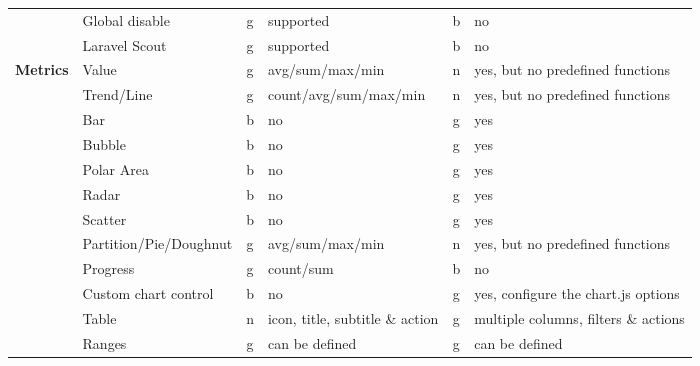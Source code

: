 \begin{table}[]
{\begin{tabular}{llclcl}
            & Global disable         & g           & supported                       & b           & no                                       \\
            & Laravel Scout          & g           & supported                       & b           & no                                       \\
            \hline
            \multirow{15}{*}{\textbf{Metrics}}       & Value                  & g           & avg/sum/max/min                 & n           & yes, but no predefined functions         \\
            & Trend/Line             & g           & count/avg/sum/max/min           & n           & yes, but no predefined functions         \\
            & Bar                    & b           & no                              & g           & yes                                      \\
            & Bubble                 & b           & no                              & g           & yes                                      \\
            & Polar Area             & b           & no                              & g           & yes                                      \\
            & Radar                  & b           & no                              & g           & yes                                      \\
            & Scatter                & b           & no                              & g           & yes                                      \\
            & Partition/Pie/Doughnut & g           & avg/sum/max/min                 & n           & yes, but no predefined functions         \\
            & Progress               & g           & count/sum                       & b           & no                                       \\
            & Custom chart control   & b           & no                              & g           & yes, configure the chart.js options      \\
            & Table                  & n           & icon, title, subtitle \& action & g           & multiple columns, filters \& actions     \\
            & Ranges                 & g           & can be defined                  & g           & can be defined                           \\

\end{tabular}}
\end{table}
